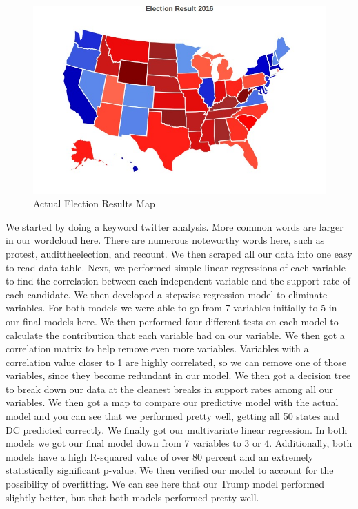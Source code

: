 \documentclass{article}
\begin{document}
{\begin{figure}[!htb]
  \centering
    \includegraphics[scale=0.5]{ActualMap}
  \caption{Actual Election Results Map}
\end{figure}  

\clearpage

We started by doing a keyword twitter analysis. More common words are larger in our wordcloud here. There are numerous noteworthy words here, such as protest, audittheelection, and recount. We then scraped all our data into one easy to read data table. Next, we performed simple linear regressions of each variable to find the correlation between each independent variable and the support rate of each candidate. We then developed a stepwise regression model to eliminate variables. For both models we were able to go from 7 variables initially to 5 in our final models here. We then performed four different tests on each model to calculate the contribution that each variable had on our variable. We then got a correlation matrix to help remove even more variables. Variables with a correlation value closer to 1 are highly correlated, so we can remove one of those variables, since they become redundant in our model. We then got a decision tree to break down our data at the cleanest breaks in support rates among all our variables. We then got a map to compare our predictive model with the actual model and you can see that we performed pretty well, getting all 50 states and DC predicted correctly. We finally got our multivariate linear regression. In both models we got our final model down from 7 variables to 3 or 4. Additionally, both models have a high R-squared value of over 80 percent and an extremely statistically significant p-value. We then verified our model to account for the possibility of overfitting. We can see here that our Trump model performed slightly better, but that both models performed pretty well.

}
\end{document}
